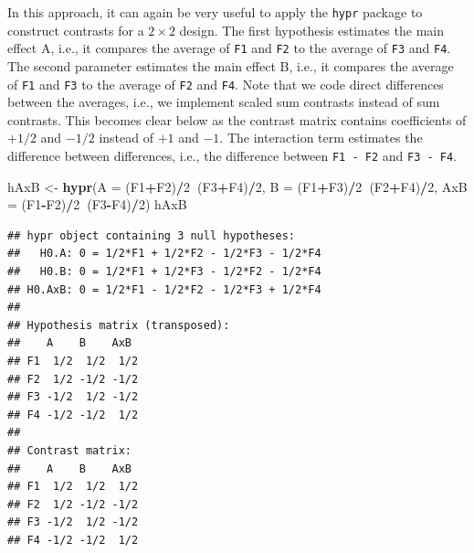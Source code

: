 \documentclass[12pt,]{krantz}
\newenvironment{Shaded}{\begin{snugshade}}{\end{snugshade}}
\newcommand{\DataTypeTok}[1]{\textcolor[rgb]{0.13,0.29,0.53}{#1}}
\newcommand{\DecValTok}[1]{\textcolor[rgb]{0.00,0.00,0.81}{#1}}
\newcommand{\KeywordTok}[1]{\textcolor[rgb]{0.13,0.29,0.53}{\textbf{#1}}}
\newcommand{\NormalTok}[1]{#1}
\newcommand{\OperatorTok}[1]{\textcolor[rgb]{0.81,0.36,0.00}{\textbf{#1}}}
\newcommand{\StringTok}[1]{\textcolor[rgb]{0.31,0.60,0.02}{#1}}
\begin{document}
In this approach, it can again be very useful to apply the \texttt{hypr} package to construct contrasts for a \(2 \times 2\) design. The first hypothesis estimates the main effect A, i.e., it compares the average of \texttt{F1} and \texttt{F2} to the average of \texttt{F3} and \texttt{F4}. The second parameter estimates the main effect B, i.e., it compares the average of \texttt{F1} and \texttt{F3} to the average of \texttt{F2} and \texttt{F4}. Note that we code direct differences between the averages, i.e., we implement scaled sum contrasts instead of sum contrasts. This becomes clear below as the contrast matrix contains coefficients of \(+1/2\) and \(-1/2\) instead of \(+1\) and \(-1\). The interaction term estimates the difference between differences, i.e., the difference between \texttt{F1\ -\ F2} and \texttt{F3\ -\ F4}.

\begin{Shaded}
\begin{Highlighting}[]
\NormalTok{hAxB <-}\StringTok{ }\KeywordTok{hypr}\NormalTok{(}\DataTypeTok{A   =}\NormalTok{ (F1}\OperatorTok{+}\NormalTok{F2)}\OperatorTok{/}\DecValTok{2}\OperatorTok{~}\NormalTok{(F3}\OperatorTok{+}\NormalTok{F4)}\OperatorTok{/}\DecValTok{2}\NormalTok{,}
             \DataTypeTok{B   =}\NormalTok{ (F1}\OperatorTok{+}\NormalTok{F3)}\OperatorTok{/}\DecValTok{2}\OperatorTok{~}\NormalTok{(F2}\OperatorTok{+}\NormalTok{F4)}\OperatorTok{/}\DecValTok{2}\NormalTok{,}
             \DataTypeTok{AxB =}\NormalTok{ (F1}\OperatorTok{-}\NormalTok{F2)}\OperatorTok{/}\DecValTok{2}\OperatorTok{~}\NormalTok{(F3}\OperatorTok{-}\NormalTok{F4)}\OperatorTok{/}\DecValTok{2}\NormalTok{)}
\NormalTok{hAxB}
\end{Highlighting}
\end{Shaded}

\begin{verbatim}
## hypr object containing 3 null hypotheses:
##   H0.A: 0 = 1/2*F1 + 1/2*F2 - 1/2*F3 - 1/2*F4
##   H0.B: 0 = 1/2*F1 + 1/2*F3 - 1/2*F2 - 1/2*F4
## H0.AxB: 0 = 1/2*F1 - 1/2*F2 - 1/2*F3 + 1/2*F4
## 
## Hypothesis matrix (transposed):
##    A    B    AxB 
## F1  1/2  1/2  1/2
## F2  1/2 -1/2 -1/2
## F3 -1/2  1/2 -1/2
## F4 -1/2 -1/2  1/2
## 
## Contrast matrix:
##    A    B    AxB 
## F1  1/2  1/2  1/2
## F2  1/2 -1/2 -1/2
## F3 -1/2  1/2 -1/2
## F4 -1/2 -1/2  1/2
\end{verbatim}

\begin{Shaded}
\end{Shaded}
\end{document}
